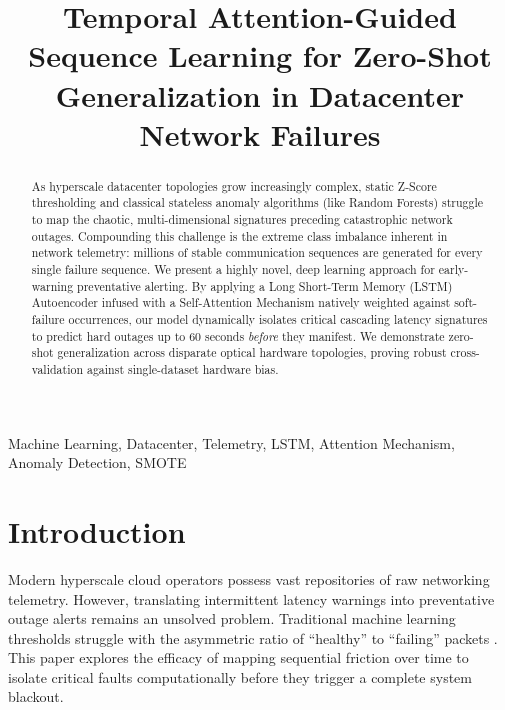 \documentclass[conference]{IEEEtran}
\begin{document}
\title{Temporal Attention-Guided Sequence Learning for Zero-Shot Generalization in Datacenter Network Failures}

\author{
}

\maketitle

\begin{abstract}
As hyperscale datacenter topologies grow increasingly complex, static Z-Score thresholding and classical stateless anomaly algorithms (like Random Forests) struggle to map the chaotic, multi-dimensional signatures preceding catastrophic network outages. Compounding this challenge is the extreme class imbalance inherent in network telemetry: millions of stable communication sequences are generated for every single failure sequence. We present a highly novel, deep learning approach for early-warning preventative alerting. By applying a Long Short-Term Memory (LSTM) Autoencoder infused with a Self-Attention Mechanism natively weighted against soft-failure occurrences, our model dynamically isolates critical cascading latency signatures to predict hard outages up to 60 seconds \textit{before} they manifest. We demonstrate zero-shot generalization across disparate optical hardware topologies, proving robust cross-validation against single-dataset hardware bias.
\end{abstract}

\begin{IEEEkeywords}
Machine Learning, Datacenter, Telemetry, LSTM, Attention Mechanism, Anomaly Detection, SMOTE
\end{IEEEkeywords}

\section{Introduction}
Modern hyperscale cloud operators possess vast repositories of raw networking telemetry. However, translating intermittent latency warnings into preventative outage alerts remains an unsolved problem. Traditional machine learning thresholds struggle with the asymmetric ratio of ``healthy'' to ``failing'' packets \cite{chen2021predictive}. This paper explores the efficacy of mapping sequential friction over time to isolate critical faults computationally before they trigger a complete system blackout.
\end{document}

